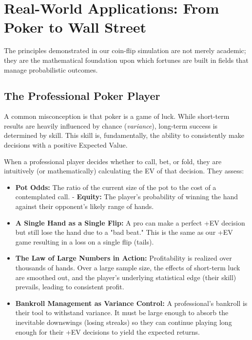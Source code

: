 \documentclass[12pt]{article}
\begin{document}
\section{Real-World Applications: From Poker to Wall Street}

The principles demonstrated in our coin-flip simulation are not merely academic; they are the mathematical foundation upon which fortunes are built in fields that manage probabilistic outcomes.

\subsection{The Professional Poker Player}
A common misconception is that poker is a game of luck. While short-term results are heavily influenced by chance (\textit{variance}), long-term success is determined by skill. This skill is, fundamentally, the ability to consistently make decisions with a positive Expected Value.

When a professional player decides whether to call, bet, or fold, they are intuitively (or mathematically) calculating the EV of that decision. They assess:
\begin{itemize}
    \item \textbf{Pot Odds:} The ratio of the current size of the pot to the cost of a contemplated call.
    - \textbf{Equity:} The player's probability of winning the hand against their opponent's likely range of hands.
\end{itemize}

\begin{itemize}
    \item \textbf{A Single Hand as a Single Flip:} A pro can make a perfect +EV decision but still lose the hand due to a "bad beat." This is the same as our +EV game resulting in a loss on a single flip (tails).
    \item \textbf{The Law of Large Numbers in Action:} Profitability is realized over thousands of hands. Over a large sample size, the effects of short-term luck are smoothed out, and the player's underlying statistical edge (their skill) prevails, leading to consistent profit.
    \item \textbf{Bankroll Management as Variance Control:} A professional's bankroll is their tool to withstand variance. It must be large enough to absorb the inevitable downswings (losing streaks) so they can continue playing long enough for their +EV decisions to yield the expected returns.
\end{itemize}
\end{document}
